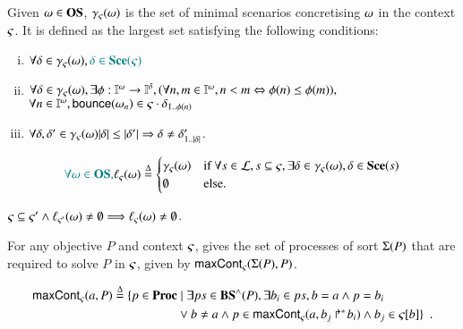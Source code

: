 \begin{definition}[$\concr: \OS \to \powerset(\Sce)$]\label{def:concr}
Given $\omega\in\mathbf{OS}$, $\gamma_\varsigma(\omega)$ is the set of minimal scenarios concretising $\omega$ in the
context $\varsigma$. It is defined as the largest set satisfying the following conditions:
\begin{enumerate}[(i)]
\item $\forall\delta\in\gamma_\varsigma(\omega), \textcolor{teal}{\delta\in\mathbf{Sce}(\varsigma)}$
\item $\forall\delta\in\gamma_\varsigma(\omega),
  \exists \phi:\mathbb{I}^{\omega}\to\mathbb{I}^{\delta},
    (\forall n,m\in\mathbb{I}^{\omega}, n<m \Leftrightarrow \phi(n)\leq\phi(m)),$
\\\hspace*{2cm}$\forall n\in\mathbb{I}^{\omega}, \mathsf{bounce}(\omega_n) \in \varsigma\cdot\delta_{1..\phi(n)}$
\item $\forall\delta,\delta'\in\gamma_\varsigma(\omega)
				|\delta|\leq|\delta'| \Rightarrow
					\delta\neq\delta'_{1..|\delta|}$.
\end{enumerate}
\end{definition}
\begin{definition}[$\uconcr: \OS \rightarrow \powerset(\Sce)$]
\label{def:uconcr}
  \[
  \textcolor{teal}{\forall \omega \in \mathbf{OS},}
  \ell_\varsigma(\omega) \stackrel{\Delta}=
  \begin{cases}
    \gamma_\varsigma(\omega) & \text{if } \forall s \in \mathcal{L}, s \subseteq \varsigma, \exists \delta \in \gamma_\varsigma(\omega), \delta \in \mathbf{Sce}(s) \\
    \emptyset & \text{else.}
  \end{cases}
  \]
\end{definition}
% 
\begin{lemma}
\label{lem:uconcr-ctx}
  $\varsigma \subseteq \varsigma' \wedge \ell_{\varsigma'}(\omega) \neq \emptyset \Longrightarrow \ell_{\varsigma}(\omega) \neq \emptyset$.
\end{lemma}

For any objective $P$ and context $\varsigma$,  gives the set of processes of sort $\Sigma(P)$ that are required to solve $P$ in $\varsigma$, given by $\mathsf{maxCont}_\varsigma(\Sigma(P), P)$.
\begin{definition}[$\gCont_\ctx : \Sigma \times \Obj \rightarrow \powerset(\PHproc)$]
  \label{def:maxCont}
  \begin{align*}
    \mathsf{maxCont}_\varsigma(a,P) \stackrel{\Delta}=
    \{ p \in \mathbf{Proc} &\mid \exists ps \in \mathbf{BS}^\wedge(P), \exists b_i \in ps, b = a \wedge p = b_i \\
      & \vee b \neq a \wedge p \in \mathsf{maxCont}_\varsigma(a, \mbox{$b_j\Rsh^*\!b_i$}) \wedge b_j \in {\varsigma[b]} \}
    \enspace.
  \end{align*}
\end{definition}

